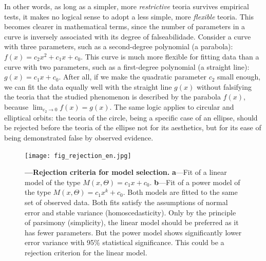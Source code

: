 \documentclass[./main_en.tex]{subfiles}
\begin{document}
\noindent In other words, as long as a simpler, more \textit{restrictive} \gls{teoria} survives empirical tests, it makes no logical sense to adopt a less simple, more \textit{flexible} \gls{teoria}. This becomes clearer in mathematical terms, since the number of \gls{parameters} in a curve is inversely associated with its degree of \gls{falseabilidade}. Consider a curve with three \gls{parameters}, such as a second-degree polynomial (a parabola): $f(x) = c_{2}x^{2} + c_{1}x + c_{0}$. This curve is much more flexible for fitting data than a curve with two \gls{parameters}, such as a first-degree polynomial (a straight line): $g(x) = c_{1}x + c_{0}$. After all, if we make the quadratic parameter $c_{2}$ small enough, we can fit the data equally well with the straight line $g(x)$ without falsifying the \gls{teoria} that the studied phenomenon is described by the parabola $f(x)$, because $\lim_{c_{2}\to0} f(x) = g(x)$. The same logic applies to circular and elliptical orbits: the \gls{teoria} of the circle, being a specific case of an ellipse, should be rejected before the \gls{teoria} of the ellipse not for its aesthetics, but for its ease of being demonstrated false by observed evidence.
\begin{figure}[t!] %
	\centering				
	\texttt{[image: fig\_rejection\_en.jpg]}		
	\caption[Rejection criteria for model selection]
	{\textbf{---\;Rejection criteria for model selection.}
        \;\textbf{a}\;---\;Fit of a linear \gls{model} of the type $M(x, \Theta) = c_{1}x + c_{0}$. \;\textbf{b}\;---\;Fit of a power \gls{model} of the type $M(x, \Theta) = c_{1}x^{k} + c_{0}$. Both models are fitted to the same set of observed data. Both fits satisfy the assumptions of normal error and stable variance (homoscedasticity). Only by the principle of parsimony (simplicity), the linear \gls{model} should be preferred as it has fewer \gls{parameters}. But the power \gls{model} shows significantly lower error variance with 95\% statistical significance. This could be a rejection criterion for the linear \gls{model}. 
	}
\label{fig:rejection}  %
\end{figure}
\end{document}
